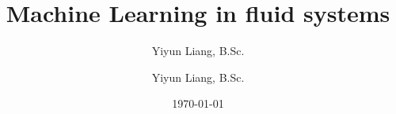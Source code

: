 \title{Machine Learning in fluid systems}

\author{Yiyun Liang, B.Sc.}
\signature{Yiyun Liang, B.Sc.}
\date{\today}
\monat{\today}

